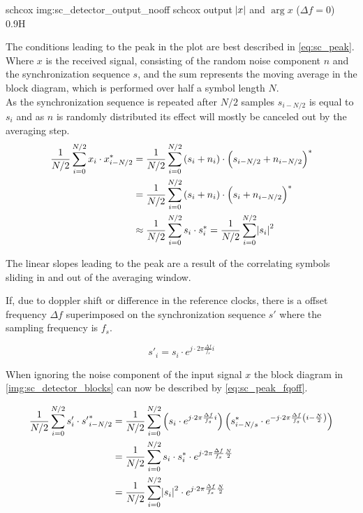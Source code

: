 \begin{subchapter}{\acrlong{schcox}}
               {img:sc_detector_output_nooff}
               {\acrshort{schcox} output $\abs{x}$ and $\arg{x}$ ($\Delta f=0$)}
               {0.9}{H}

  The conditions leading to the peak in the plot are best
  described in \autoref{eq:sc_peak}.
  Where $x$ is the received signal, consisting of the
  random noise component $n$ and the synchronization sequence $s$,
  and the sum represents the moving average in the block diagram,
  which is performed over half a symbol length $N$. \\

  As the synchronization sequence is repeated after $N/2$ samples
  $s_{i-N/2}$ is equal to $s_{i}$ and as $n$ is randomly distributed
  its effect will mostly be canceled out by the averaging step. \\

  \begin{align}
    \label{eq:sc_peak}
    \frac{1}{N/2} \sum_{i=0}^{N/2} x_{i} \cdot x_{i-N/2}^\ast &=
    \frac{1}{N/2} \sum_{i=0}^{N/2} \left(s_{i} + n_{i} \right) \cdot \left(s_{i-N/2} + n_{i-N/2} \right)^\ast \nonumber \\
    &= \frac{1}{N/2} \sum_{i=0}^{N/2} \left(s_{i} + n_{i} \right) \cdot \left(s_{i} + n_{i-N/2} \right)^\ast \nonumber \\
    &\approx \frac{1}{N/2} \sum_{i=0}^{N/2} s_{i} \cdot s_{i}^\ast
    = \frac{1}{N/2} \sum_{i=0}^{N/2} \abs{s_{i}}^2
  \end{align}

  The linear slopes leading to the peak are a result of the
  correlating symbols sliding in and out of the averaging
  window.
  
  If, due to doppler shift or difference in the reference clocks,
  there is a offset frequency $\Delta f$ superimposed on the
  synchronization sequence $s'$ where the sampling frequency is $f_s$.

  \begin{equation*}
    s'_{i}= s_{i} \cdot e^{j\cdot 2 \pi \frac{\Delta f}{f_s}i}
  \end{equation*}

  When ignoring the noise component of the input signal $x$ the
  block diagram in \autoref{img:sc_detector_blocks} can
  now be described by \autoref{eq:sc_peak_fqoff}.

  \begin{align}
    \label{eq:sc_peak_fqoff}
    \frac{1}{N/2} \sum_{i=0}^{N/2} s'_{i} \cdot {s'}_{i-N/2}^{\ast}
    &= \frac{1}{N/2} \sum_{i=0}^{N/2}
     \left( s_{i} \cdot e^{j\cdot 2 \pi \frac{\Delta f}{f_s}i} \right)
     \left( s_{i-N/s}^{\ast} \cdot e^{-j\cdot 2 \pi \frac{\Delta f}{f_s} \left( i- \frac{N}{2} \right)} \right) \nonumber \\
    &= \frac{1}{N/2} \sum_{i=0}^{N/2} s_{i} \cdot s_{i}^\ast \cdot e^{j\cdot 2 \pi \frac{\Delta f}{f_s} \frac{N}{2}} \nonumber \\
    &= \frac{1}{N/2} \sum_{i=0}^{N/2} \abs{s_{i}}^2 \cdot e^{j\cdot 2 \pi \frac{\Delta f}{f_s} \frac{N}{2}}
  \end{align}


\end{subchapter}

